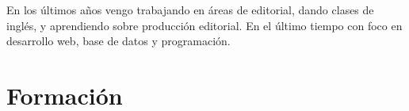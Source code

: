 \documentclass[a4paper, hidelinks]{twentysecondcv}
\begin{document}
En los últimos años vengo trabajando en áreas de %
editorial, dando clases de inglés, y aprendiendo sobre producción editorial. 
En el último tiempo con foco en desarrollo web, base de datos y programación.





\vspace{0.5cm}

\section{Formación}
\end{document}
